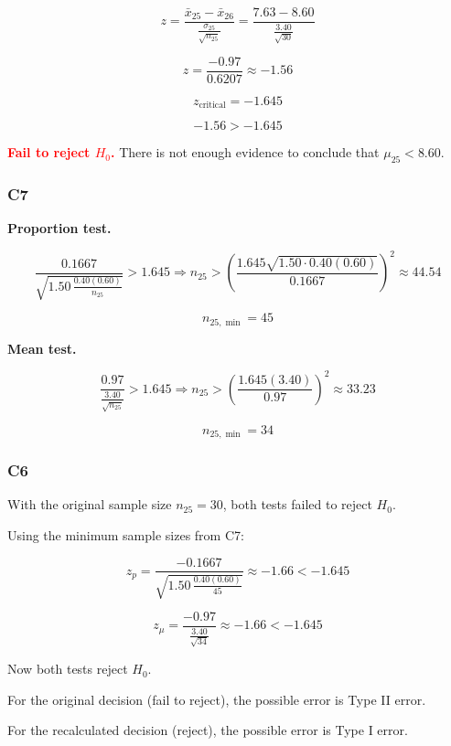 \documentclass[12pt]{article}
\newcommand{\FailDecision}[1]{%
	\textcolor{red}{\textbf{Fail to reject \(H_0\).}} #1%
}
\begin{document}
	\[
	z=
	\frac{\bar{x}_{25}-\bar{x}_{26}}{\frac{\sigma_{25}}{\sqrt{n_{25}}}}
	=
	\frac{7.63-8.60}{\frac{3.40}{\sqrt{30}}}
	\]
	
	\[
	z=
	\frac{-0.97}{0.6207}
	\approx
	-1.56
	\]
	
	\[
	z_{\text{critical}}=-1.645
	\]
	
	\[
	-1.56>-1.645
	\]
	
	\FailDecision{There is not enough evidence to conclude that \(\mu_{25}<8.60\).}
	
	\subsubsection*{C7}

	\textbf{Proportion test.}

	\[
	\frac{0.1667}{\sqrt{1.50\,\frac{0.40(0.60)}{n_{25}}}}>1.645
	\Rightarrow
	n_{25}>
	\left(
	\frac{1.645\sqrt{1.50\cdot 0.40(0.60)}}{0.1667}
	\right)^2
	\approx 44.54
	\]

	\[
	n_{25,\min}=45
	\]

	\textbf{Mean test.}

	\[
	\frac{0.97}{\frac{3.40}{\sqrt{n_{25}}}}>1.645
	\Rightarrow
	n_{25}>
	\left(\frac{1.645(3.40)}{0.97}\right)^2
	\approx 33.23
	\]

	\[
	n_{25,\min}=34
	\]

	\subsubsection*{C6}

	With the original sample size \(n_{25}=30\), both tests failed to reject \(H_0\).

	Using the minimum sample sizes from C7:

	\[
	z_p=\frac{-0.1667}{\sqrt{1.50\,\frac{0.40(0.60)}{45}}}\approx -1.66<-1.645
	\]

	\[
	z_\mu=\frac{-0.97}{\frac{3.40}{\sqrt{34}}}\approx -1.66<-1.645
	\]

	Now both tests reject \(H_0\).

	For the original decision (fail to reject), the possible error is Type II error.

	For the recalculated decision (reject), the possible error is Type I error.
\end{document}
